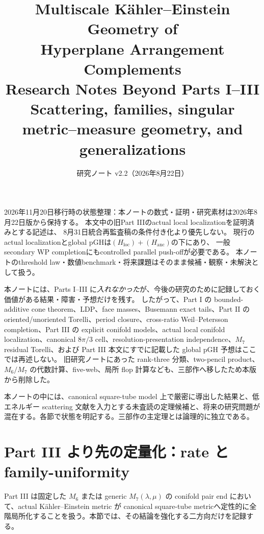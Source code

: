 \documentclass[11pt,a4paper]{ltjsarticle}
\title{\bfseries Multiscale K\"ahler--Einstein Geometry of\\
Hyperplane Arrangement Complements\\[2mm]
\large Research Notes Beyond Parts I--III\\
Scattering, families, singular metric--measure geometry, and generalizations}
\author{}
\date{研究ノート v2.2（2026年8月22日）}
\theoremstyle{plain}
\theoremstyle{definition}
\theoremstyle{remark}
\begin{document}
\maketitle

\begin{warningbox}
2026年11月20日移行時の状態整理：本ノートの数式・証明・研究素材は2026年8月22日版から保持する。
本文中の旧Part IIIのactual local localizationを証明済みとする記述は、
8月31日統合再監査稿の条件付き化より優先しない。
現行のactual localizationとglobal pGHは$(H_{\mathrm{loc}})+(H_{\mathrm{anc}})$の下にあり、
一般secondary WP completionにもcontrolled parallel push-offが必要である。
本ノートのthreshold law・数値benchmark・将来課題はそのまま候補・観察・未解決として扱う。
\end{warningbox}


\begin{scopebox}
本ノートには、Parts I--III に\emph{入れなかった}が、今後の研究のために記録しておく価値がある結果・障害・予想だけを残す。
したがって、Part I の bounded-additive cone theorem、LDP、face masses、Busemann exact tails、Part II の oriented/unoriented Torelli、period closure、cross-ratio Weil--Petersson completion、Part III の explicit conifold models、actual local conifold localization、canonical $8\pi/3$ cell、resolution-presentation independence、$M_7$ residual Torelli、および Part III 本文にすでに記載した global pGH 予想はここでは再述しない。
旧研究ノートにあった rank-three 分類、two-pencil product、$M_6/M_7$ の代数計算、five-web、局所 flop 計算なども、三部作へ移したため本版から削除した。
\end{scopebox}

\begin{warningbox}
本ノートの中には、canonical square-tube model 上で厳密に導出した結果と、低エネルギー scattering 文献を入力とする未査読の定理候補と、将来の研究問題が混在する。各節で状態を明記する。三部作の主定理とは論理的に独立である。
\end{warningbox}

\tableofcontents

\section{Part III より先の定量化：rate と family-uniformity}

Part III は固定した $M_6$ または generic $M_7(\lambda,\mu)$ の conifold pair end において、actual K\"ahler--Einstein metric が canonical square-tube metricへ定性的に全階局所化することを扱う。本節では、その結論を強化する二方向だけを記録する。
\end{document}

